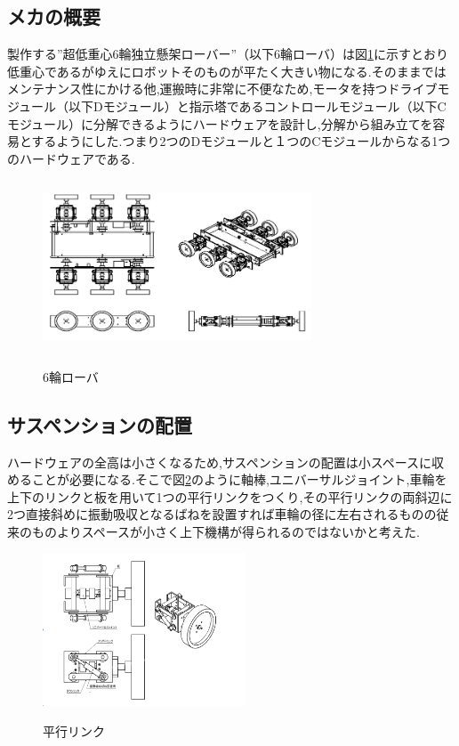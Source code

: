 \documentclass[12pt,oneside]{sotsuken_paper}
\begin{document}
\subsection{メカの概要}

製作する”超低重心6輪独立懸架ローバー”（以下6輪ローバ）は図\ref{fig:rokurin}に示すとおり低重心であるがゆえにロボットそのものが平たく大きい物になる.そのままではメンテナンス性にかける他,運搬時に非常に不便なため,モータを持つドライブモジュール（以下Dモジュール）と指示塔であるコントロールモジュール（以下Cモジュール）に分解できるようにハードウェアを設計し,分解から組み立てを容易とするようにした.つまり2つのDモジュールと１つのCモジュールからなる1つのハードウェアである.

\begin{figure}[htp]
 \begin{center}
  \includegraphics[height=51mm,width=80mm]{img/hard/fig3.png}
 　\caption{6輪ローバ}
  \label{fig:rokurin}%
 \end{center}
\end{figure}

\subsection{サスペンションの配置}

ハードウェアの全高は小さくなるため,サスペンションの配置は小スペースに収めることが必要になる.そこで図\ref{fig:box}のように軸棒,ユニバーサルジョイント,車輪を上下のリンクと板を用いて1つの平行リンクをつくり,その平行リンクの両斜辺に2つ直接斜めに振動吸収となるばねを設置すれば車輪の径に左右されるものの従来のものよりスペースが小さく上下機構が得られるのではないかと考えた.

\begin{figure}[htbt]
 \begin{center}
  \includegraphics[width=60mm]{img/hard/fig4.png}
 　\caption{平行リンク}
  \label{fig:box}%
 \end{center}
\end{figure}
\end{document}
